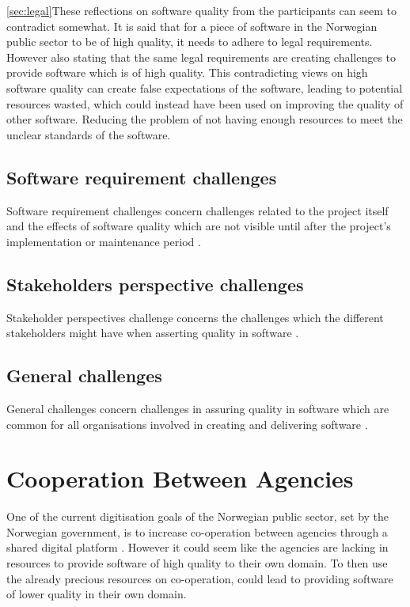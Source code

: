 \autoref{sec:legal}These reflections on software quality from the participants can seem to contradict somewhat. It is said that for a piece of software in the Norwegian public sector to be of high quality, it needs to adhere to legal requirements. However also stating that the same legal requirements are creating challenges to provide software which is of high quality. This contradicting views on high software quality can create false expectations of the software, leading to potential resources wasted, which could instead have been used on improving the quality of other software. Reducing the problem of not having enough resources to meet the unclear standards of the software.

\subsection{Software requirement challenges}
Software requirement challenges concern challenges related to the project itself and the effects of software quality which are not visible until after the project's implementation or maintenance period \cite{sh_2018}.

\subsection{Stakeholders perspective challenges}
Stakeholder perspectives challenge concerns the challenges which the different stakeholders might have when asserting quality in software \cite{sh_2018}.

\subsection{General challenges}
General challenges concern challenges in assuring quality in software which are common for all organisations involved in creating and delivering software \cite{sh_2018}.











\section{Cooperation Between Agencies}
One of the current digitisation goals of the Norwegian public sector, set by the Norwegian government, is to increase co-operation between agencies through a shared digital platform \cite{r_2019}. However it could seem like the agencies are lacking in resources to provide software of high quality to their own domain. To then use the already precious resources on co-operation, could lead to providing software of lower quality in their own domain. 

